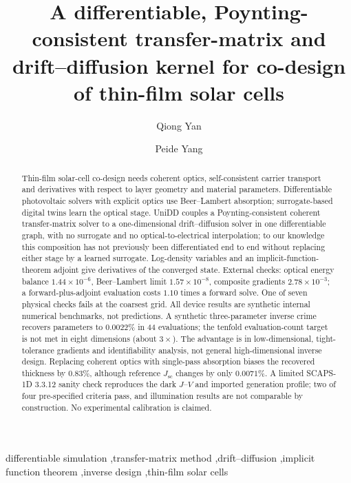 \documentclass[preprint,12pt]{elsarticle}
\begin{document}
\begin{frontmatter}

\title{A differentiable, Poynting-consistent transfer-matrix and drift--diffusion kernel for co-design of thin-film solar cells}

\author[addr1]{Qiong Yan}

\author[addr2,addr3]{Peide Yang}

\address[addr1]{Department of Electronic Information Science, Fujian Jiangxia
University, Fuzhou 350108, China}
\address[addr2]{School of Electronic Science and Technology, Xiamen University
Tan Kah Kee College, Xiamen, China}
\address[addr3]{Xiamen University Tan Kah Kee College, Key Laboratory of
Intelligent Manufacturing Equipment and Industrial Internet Technology for
Universities of Fujian Province, Xiamen, China}

\begin{abstract}
Thin-film solar-cell co-design needs coherent optics, self-consistent carrier
transport and derivatives with respect to layer geometry and material
parameters. Differentiable photovoltaic solvers with explicit optics use
Beer--Lambert absorption; surrogate-based digital twins learn the optical
stage. UniDD couples a Poynting-consistent coherent transfer-matrix solver to
a one-dimensional drift--diffusion solver in one differentiable graph, with
no surrogate and no optical-to-electrical interpolation; to our knowledge
this composition has not previously been differentiated end to end without
replacing either stage by a learned surrogate. Log-density variables and an
implicit-function-theorem adjoint give derivatives of the converged state.
External checks: optical energy balance $1.44\times10^{-6}$, Beer--Lambert
limit $1.57\times10^{-8}$, composite gradients $2.78\times10^{-3}$; a
forward-plus-adjoint evaluation costs $1.10$ times a forward solve. One of
seven physical checks fails at the coarsest grid. All device results are
synthetic internal numerical benchmarks, not predictions. A synthetic
three-parameter inverse crime recovers parameters to $0.0022\%$ in 44
evaluations; the tenfold evaluation-count target is not met in eight
dimensions (about $3\times$). The advantage is in low-dimensional,
tight-tolerance gradients and identifiability analysis, not general
high-dimensional inverse design. Replacing coherent optics with single-pass
absorption biases the recovered thickness by 0.83\%, although reference
$J_{\mathrm{sc}}$ changes by only $0.0071\%$. A limited SCAPS-1D 3.3.12
sanity check reproduces the dark $J$--$V$ and imported generation profile;
two of four pre-specified criteria pass, and illumination results are not
comparable by construction. No experimental calibration is claimed.
\end{abstract}

\begin{keyword}
differentiable simulation \sep transfer-matrix method \sep drift--diffusion
\sep implicit function theorem \sep inverse design \sep thin-film solar cells
\end{keyword}

\end{frontmatter}
\end{document}
